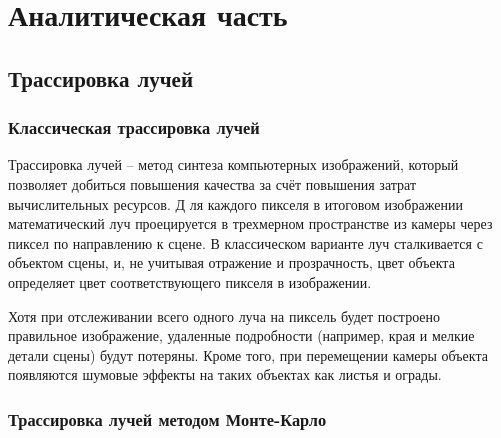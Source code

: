 \chapter{Аналитическая часть}

\section{Трассировка лучей}

\subsection{Классическая трассировка лучей}

 


Трассировка лучей -- метод синтеза компьютерных изображений, который позволяет добиться повышения качества за счёт повышения затрат вычислительных ресурсов.
Д ля каждого пикселя в итоговом изображении математический луч проецируется в трехмерном пространстве из камеры через пиксел по направлению к сцене. В классическом варианте луч сталкивается с объектом сцены, и, не учитывая отражение и прозрачность, цвет объекта определяет цвет соответствующего пикселя в изображении.

Хотя при отслеживании всего одного луча на пиксель будет построено правильное изображение, удаленные подробности (например, края и мелкие детали сцены) будут потеряны. Кроме того, при перемещении камеры объекта появляются шумовые эффекты на таких объектах как листья и ограды.

 
\subsection{Трассировка лучей методом Монте-Карло}

